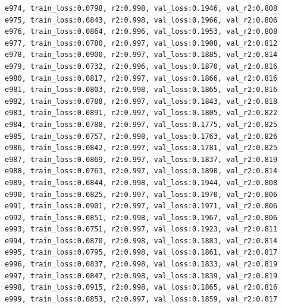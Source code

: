 \documentclass[a4paper, 12pt]{article}
\begin{document}
\begin{lstlisting}
e974, train_loss:0.0798, r2:0.998, val_loss:0.1946, val_r2:0.808
e975, train_loss:0.0843, r2:0.998, val_loss:0.1966, val_r2:0.806
e976, train_loss:0.0864, r2:0.996, val_loss:0.1953, val_r2:0.808
e977, train_loss:0.0780, r2:0.997, val_loss:0.1908, val_r2:0.812
e978, train_loss:0.0900, r2:0.997, val_loss:0.1885, val_r2:0.814
e979, train_loss:0.0732, r2:0.996, val_loss:0.1870, val_r2:0.816
e980, train_loss:0.0817, r2:0.997, val_loss:0.1866, val_r2:0.816
e981, train_loss:0.0803, r2:0.998, val_loss:0.1865, val_r2:0.816
e982, train_loss:0.0788, r2:0.997, val_loss:0.1843, val_r2:0.818
e983, train_loss:0.0891, r2:0.997, val_loss:0.1805, val_r2:0.822
e984, train_loss:0.0788, r2:0.997, val_loss:0.1775, val_r2:0.825
e985, train_loss:0.0757, r2:0.998, val_loss:0.1763, val_r2:0.826
e986, train_loss:0.0842, r2:0.997, val_loss:0.1781, val_r2:0.825
e987, train_loss:0.0869, r2:0.997, val_loss:0.1837, val_r2:0.819
e988, train_loss:0.0763, r2:0.997, val_loss:0.1890, val_r2:0.814
e989, train_loss:0.0844, r2:0.998, val_loss:0.1944, val_r2:0.808
e990, train_loss:0.0825, r2:0.997, val_loss:0.1970, val_r2:0.806
e991, train_loss:0.0901, r2:0.997, val_loss:0.1971, val_r2:0.806
e992, train_loss:0.0851, r2:0.998, val_loss:0.1967, val_r2:0.806
e993, train_loss:0.0751, r2:0.997, val_loss:0.1923, val_r2:0.811
e994, train_loss:0.0870, r2:0.998, val_loss:0.1883, val_r2:0.814
e995, train_loss:0.0795, r2:0.998, val_loss:0.1861, val_r2:0.817
e996, train_loss:0.0837, r2:0.998, val_loss:0.1833, val_r2:0.819
e997, train_loss:0.0847, r2:0.998, val_loss:0.1839, val_r2:0.819
e998, train_loss:0.0915, r2:0.998, val_loss:0.1865, val_r2:0.816
e999, train_loss:0.0853, r2:0.997, val_loss:0.1859, val_r2:0.817	
\end{lstlisting}	
\end{document}
